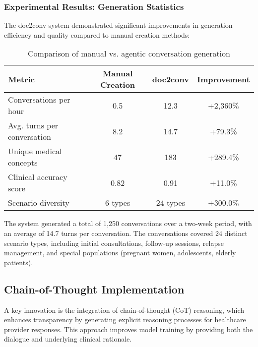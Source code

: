 \subsubsection{Experimental Results: Generation Statistics}

The doc2conv system demonstrated significant improvements in generation efficiency and quality compared to manual creation methods:

\begin{table}[h]
    \centering
    \setlength{\tabcolsep}{4pt}
    \renewcommand{\arraystretch}{1.3}
    \begin{tabular}{|l|c|c|c|}
        \hline
        \rowcolor{gray!15} \textbf{Metric} & \textbf{Manual Creation} & \textbf{doc2conv} & \textbf{Improvement} \\
        \hline
        Conversations per hour & 0.5 & 12.3 & +2,360\% \\
        \hline
        Avg. turns per conversation & 8.2 & 14.7 & +79.3\% \\
        \hline
        Unique medical concepts & 47 & 183 & +289.4\% \\
        \hline
        Clinical accuracy score & 0.82 & 0.91 & +11.0\% \\
        \hline
        Scenario diversity & 6 types & 24 types & +300.0\% \\
        \hline
    \end{tabular}
    \caption{Comparison of manual vs. agentic conversation generation}
    \label{tab:generation_comparison}
\end{table}

The system generated a total of 1,250 conversations over a two-week period, with an average of 14.7 turns per conversation. The conversations covered 24 distinct scenario types, including initial consultations, follow-up sessions, relapse management, and special populations (pregnant women, adolescents, elderly patients).

\subsection{Chain-of-Thought Implementation}

A key innovation is the integration of chain-of-thought (CoT) reasoning, which enhances transparency by generating explicit reasoning processes for healthcare provider responses. This approach improves model training by providing both the dialogue and underlying clinical rationale.

